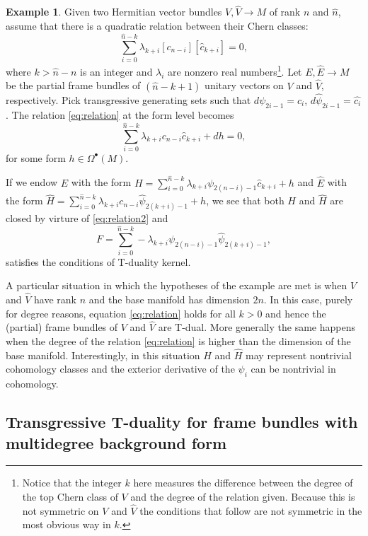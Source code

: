 \documentclass[12pt,twoside]{article}
\theoremstyle{plain}
\theoremstyle{definition}
\newtheorem{example}[theorem]{Example}
\numberwithin{equation}{section}
\begin{document}
\begin{example}\label{ex:which H}
Given two Hermitian vector bundles $V, \hat{V}\to M$ of rank $n$ and $\hat{n}$, assume that there is a quadratic relation between their Chern classes:
\begin{equation}\label{eq:relation}
\sum_{i=0}^{\hat{n}-k} \lambda_{k+i}[c_{n-i}][\hat{c}_{k+i}] =0,
\end{equation}
where $k> \hat{n}-n$ is an integer and $\lambda_i$ are nonzero real numbers\footnote{Notice that the integer $k$ here measures the difference between the degree of the top Chern class of $V$ and the degree of the relation given. Because this is not symmetric on $V$ and $\hat{V}$ the conditions that follow are not symmetric in the most obvious way in $k$.}. Let $E,\hat{E}\to M$ be the partial frame bundles of $(\hat{n}-k+1)$ unitary vectors on $V$ and $\hat{V}$, respectively. Pick transgressive generating sets such that $d\psi_{2i-1} = c_i$,  $d\hat\psi_{2i-1} = \hat{c_i}$. The relation \eqref{eq:relation} at the form level becomes
  \begin{equation}\label{eq:relation2}
\sum_{i=0}^{\hat{n}-k} \lambda_{k+i}c_{n-i}\hat{c}_{k+i} +dh =0,
\end{equation}
for some form $h \in \Omega^\bullet(M)$.

If we endow $E$ with the form $H = \sum_{i=0}^{\hat{n}-k} \lambda_{k+i}\psi_{2(n-i)-1}\hat{c}_{k+i} +h$ and $\hat{E}$ with the form $\hat{H} = \sum_{i=0}^{\hat{n}-k} \lambda_{k+i}c_{n-i}\hat{\psi}_{2(k+i)-1} +h$, we see that both $H$ and $\hat{H}$ are closed by virture of \eqref{eq:relation2} and
\[F = \sum_{i=0}^{\hat{n}-k} -\lambda_{k+i}\psi_{2(n-i)-1}\hat{\psi}_{2(k+i)-1},\]
satisfies the conditions of T-duality kernel.

A particular situation in which the hypotheses of the example are met is when $V$ and $\hat{V}$ have rank $n$ and the base manifold has dimension $2n$. In this case, purely for degree reasons, equation \eqref{eq:relation} holds for all $k>0$ and hence the (partial) frame bundles of $V$ and $\hat{V}$ are T-dual.  More generally the same happens when the degree of the relation \eqref{eq:relation} is higher than the dimension of the base manifold. Interestingly, in this situation $H$ and $\hat{H}$ may represent nontrivial cohomology classes and the exterior derivative of the $\psi_i$ can be nontrivial in cohomology.
\end{example}



\subsection{Transgressive T-duality for frame bundles with multidegree background form}
\end{document}
